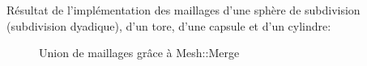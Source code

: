 Résultat de l'implémentation des maillages d'une sphère de subdivision (subdivision dyadique), d'un tore, d'une capsule et d'un cylindre:

\begin{figure}[h!]

	\caption{Union de maillages grâce à Mesh::Merge}
\end{figure}
\FloatBarrier
